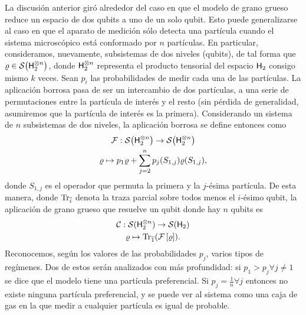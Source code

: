 
La discusión anterior giró alrededor del caso en que el modelo de grano grueso reduce un espacio de dos qubits a uno de un solo qubit. Esto puede generalizarse al caso en que el aparato de medición sólo detecta una partícula cuando el sistema microscópico está conformado por $n$ partículas. En particular, consideramos, nuevamente, subsistemas de dos niveles (qubits), de tal forma que $\varrho\in\mathcal{S}\qty( {\sf H}_{2}^{\otimes n})$, donde ${\sf H}_{2}^{\otimes n}$ representa el producto tensorial del espacio ${\sf H}_{2}$ consigo mismo $k$ veces. Sean $p_{i}$ las probabilidades de medir cada una de las partículas. La aplicación borrosa pasa de ser un intercambio de dos partículas, a una serie de permutaciones entre la partícula de interés y el resto (sin pérdida de generalidad, asumiremos que la partícula de interés es la primera). Considerando un sistema de $n$ subsistemas de dos niveles, la aplicación borrosa se define entonces como
\begin{gather}
    \mathcal{F}:\mathcal{S}\qty( {\sf H}_{2}^{\otimes n})\to \mathcal{S}\qty( {\sf H}_{2}^{\otimes n})\nonumber\\
    \varrho \mapsto p_{1}\varrho+\sum_{j=2}^{n}p_{j}(S_{1,j})\varrho(S_{1,j}),\nonumber
\end{gather}
donde $S_{1,j}$ es el operador que permuta la primera y la $j$-ésima partícula. De esta manera, donde $\Tr_{\overline{i}}$ denota la traza parcial sobre todos menos el $i$-ésimo qubit, la aplicación de grano grueso que resuelve un qubit donde hay $n$ qubits es
\begin{gather}\label{eq:CG}
    \mathcal{C}:\mathcal{S}( {\sf H}_{2}^{\otimes n})\to \mathcal{S}({\sf H}_{2})\nonumber\\
    \varrho\mapsto\Tr_{\overline{1}}(\mathcal{F}\left[\varrho\right]).
\end{gather}
Reconocemos, según los valores de las probabilidades $p_{j}$, varios tipos de regímenes. Dos de estos serán analizados con más profundidad: si $p_{1}>p_{j}\forall j\neq 1$ se dice que el modelo tiene una partícula preferencial. Si $p_{j}=\frac{1}{n}\forall j$ entonces no existe ninguna partícula preferencial, y se puede ver al sistema como una caja de gas en la que medir a cualquier partícula es igual de probable.